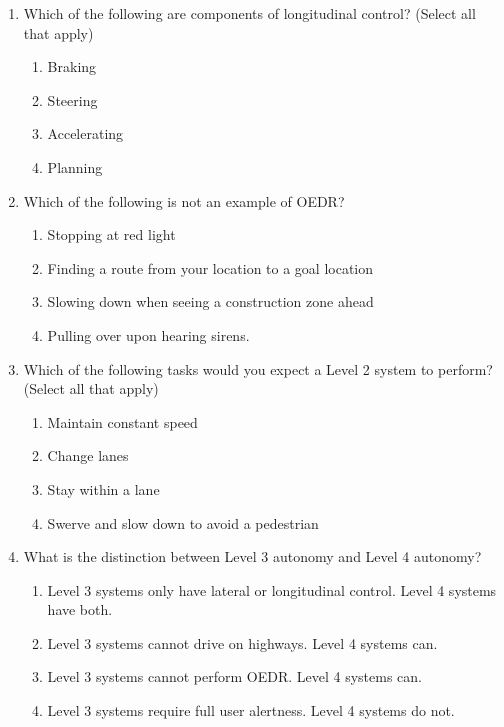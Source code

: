 \begin{enumerate}

\item Which of the following are components of longitudinal control? (Select all that apply)
\begin{enumerate}
\item Braking
\item Steering
\item Accelerating
\item Planning
\end{enumerate}

\item Which of the following is not an example of OEDR?

\begin{enumerate}
\item Stopping at red light
\item Finding a route from your location to a goal location
\item Slowing down when seeing a construction zone ahead
\item Pulling over upon hearing sirens.
\end{enumerate}

\item Which of the following tasks would you expect a Level 2 system to perform? (Select all that apply)

\begin{enumerate}
\item Maintain constant speed
\item Change lanes
\item Stay within a lane
\item Swerve and slow down to avoid a pedestrian
\end{enumerate}

\item What is the distinction between Level 3 autonomy and Level 4 autonomy? 


\begin{enumerate}
\item Level 3 systems only have lateral or longitudinal control. Level 4 systems have both.
\item Level 3 systems cannot drive on highways. Level 4 systems can.
\item Level 3 systems cannot perform OEDR. Level 4 systems can.
\item Level 3 systems require full user alertness. Level 4 systems do not.
\end{enumerate}


\end{enumerate}
